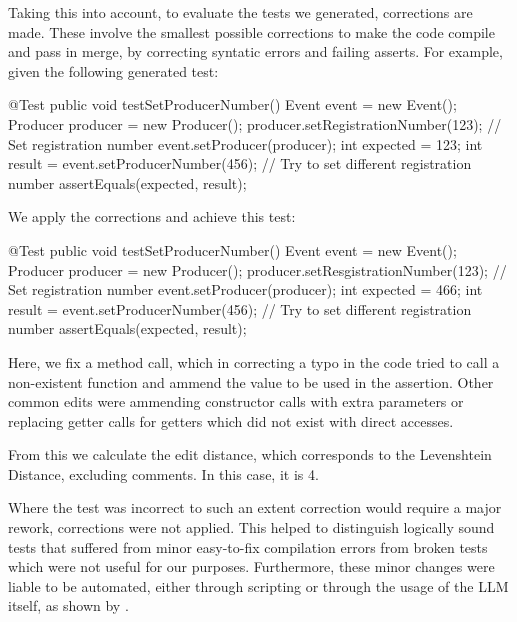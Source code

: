 Taking this into account, to evaluate the tests we generated, corrections are made. These involve the smallest possible corrections to make the code compile and pass in merge, by correcting syntatic errors and failing asserts.
For example, given the following generated test:
\begin{response}
  @Test
  public void testSetProducerNumber() {
      Event event = new Event();
      Producer producer = new Producer();
      producer.setRegistrationNumber(123); // Set registration number
      event.setProducer(producer);
      int expected = 123;
      int result = event.setProducerNumber(456); // Try to set different registration number
      assertEquals(expected, result);
  }
\end{response}
We apply the corrections and achieve this test:
\begin{response}
  @Test
  public void testSetProducerNumber() {
      Event event = new Event();
      Producer producer = new Producer();
      producer.setResgistrationNumber(123); // Set registration number
      event.setProducer(producer);
      int expected = 466;
      int result = event.setProducerNumber(456); // Try to set different registration number
      assertEquals(expected, result);
  }
\end{response}
Here, we fix a method call, which in correcting a typo in the code tried to call a non-existent function and ammend the value to be used in the assertion.
Other common edits were ammending constructor calls with extra parameters or replacing getter calls for getters which did not exist with direct accesses.

From this we calculate the edit distance, which corresponds to the Levenshtein Distance, excluding comments.
In this case, it is 4.

Where the test was incorrect to such an extent correction would require a major rework, corrections were not applied. This helped to distinguish logically sound tests
that suffered from minor easy-to-fix compilation errors from broken tests which were not useful for our purposes. Furthermore, these minor changes were liable to be automated,
either through scripting or through the usage of the LLM itself, as shown by .

